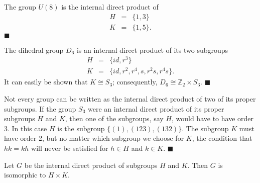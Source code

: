  
\medskip

 
The group $U(8)$ is the internal direct product of
\begin{eqnarray*}
H & = & \{1, 3 \} \\
K & = & \{1, 5 \}.
\end{eqnarray*}
\hspace{\fill} $\blacksquare$

 
\medskip

 
The dihedral group $D_6$ is an internal direct product of its two
subgroups 
\begin{eqnarray*}
H & = & \{id, r^3  \} \\
K & = & \{id, r^2, r^4, s, r^2s, r^4 s   \}.
\end{eqnarray*}
It can easily be shown that $K \cong S_3$; consequently, $D_6 \cong
{\mathbb Z}_2 \times S_3$. 
\hspace{\fill} $\blacksquare$

 
\medskip

 
Not every group can be written as the internal direct product of two
of its proper subgroups.  If the group $S_3$ were an internal direct
product of its proper subgroups $H$ and $K$, then one of the  subgroups,
say $H$, would have to have order 3. In this case $H$ is the subgroup $\{
(1), (123), (132) \}$. The subgroup $K$ must have order 2, but no
matter which subgroup we choose for $K$, the condition that $hk = kh$
will never be satisfied for $h \in H$ and $k \in K$.
\mbox{\hspace{1in}}
\hspace{\fill} $\blacksquare$

 
\begin{theorem}
Let $G$ be the internal direct product of  subgroups $H$ and $K$. Then
$G$ is isomorphic to $H \times K$. 
\end{theorem}
 

